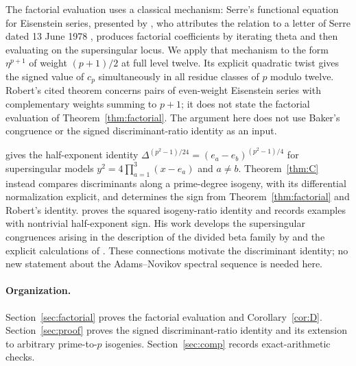 \documentclass[11pt,a4paper]{article}
\numberwithin{equation}{section}
\theoremstyle{definition}
\theoremstyle{remark}
\begin{document}
The factorial evaluation uses a classical mechanism: Serre's functional
equation for Eisenstein series, presented by
\citet[\S2.5, Th\'eor\`eme~2, p.~119]{Robert80}, who attributes the relation
to a letter of Serre dated 13 June 1978 \citep[\S0.3, p.~109]{Robert80}, produces factorial
coefficients by iterating theta and then evaluating on the supersingular
locus. We apply that mechanism to the form $\eta^{p+1}$ of weight
$(p+1)/2$ at full level twelve. Its explicit quadratic twist gives the
signed value of $c_p$ simultaneously in all residue classes of $p$
modulo twelve. %
Robert's cited theorem concerns pairs of even-weight
Eisenstein series with complementary weights summing to $p+1$; it does
not state the factorial evaluation of Theorem~\ref{thm:factorial}. The argument here does not use
Baker's congruence or the signed discriminant-ratio identity as an input.

\citet[Theorem~3, p.~72; \S4]{Landweber88} gives the
half-exponent identity
$\Delta^{(p^2-1)/24}=(e_a-e_b)^{(p^2-1)/4}$ for supersingular
models $y^2=4\prod_{a=1}^3(x-e_a)$ and $a\ne b$.
Theorem~\ref{thm:C} instead compares discriminants along a prime-degree
isogeny, with its differential normalization explicit, and determines
the sign from Theorem~\ref{thm:factorial} and Robert's identity.
\citet[Theorem~1.2 and Remark~4]{Ono25}
proves the squared isogeny-ratio identity and records examples with nontrivial
half-exponent sign. His work develops the supersingular congruences arising in
the description of the divided beta family by \citet[Theorem~1.2]{Behrens09}
and the explicit calculations of \citet[\S5.4, Conjecture~5.17]{Larson20}.
These connections motivate the discriminant identity; no new statement about the
Adams--Novikov spectral sequence is needed here.

\paragraph{Organization.}
Section~\ref{sec:factorial} proves the factorial evaluation and
Corollary~\ref{cor:D}. Section~\ref{sec:proof} proves the signed
discriminant-ratio identity and its extension to arbitrary prime-to-$p$
isogenies. Section~\ref{sec:comp} records exact-arithmetic checks.
\end{document}
